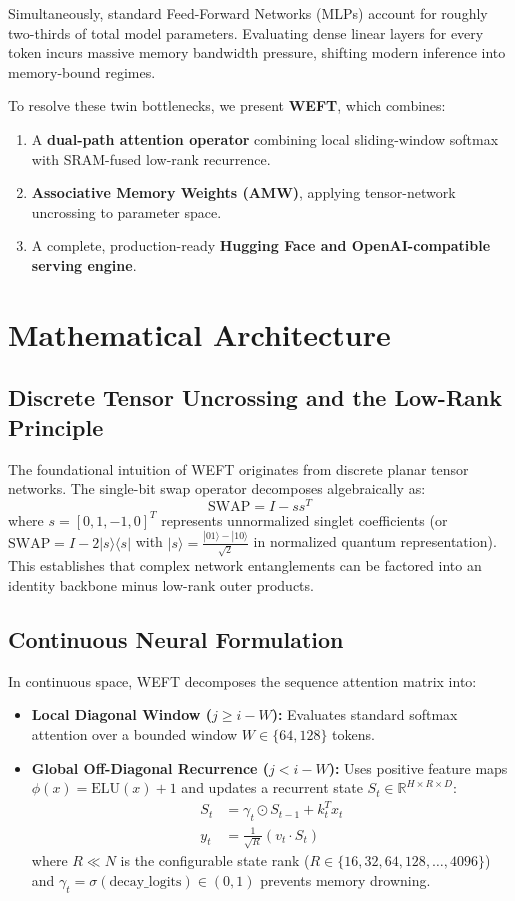\documentclass[11pt,a4paper]{article}
\begin{document}
Simultaneously, standard Feed-Forward Networks (MLPs) account for roughly two-thirds of total model parameters. Evaluating dense linear layers for every token incurs massive memory bandwidth pressure, shifting modern inference into memory-bound regimes.

To resolve these twin bottlenecks, we present \textbf{WEFT}, which combines:
\begin{enumerate}
    \item A \textbf{dual-path attention operator} combining local sliding-window softmax with SRAM-fused low-rank recurrence.
    \item \textbf{Associative Memory Weights (AMW)}, applying tensor-network uncrossing to parameter space.
    \item A complete, production-ready \textbf{Hugging Face and OpenAI-compatible serving engine}.
\end{enumerate}

\section{Mathematical Architecture}

\subsection{Discrete Tensor Uncrossing and the Low-Rank Principle}
The foundational intuition of WEFT originates from discrete planar tensor networks. The single-bit swap operator decomposes algebraically as:
\begin{equation}
\text{SWAP} = I - s s^T
\end{equation}
where $s = [0, 1, -1, 0]^T$ represents unnormalized singlet coefficients (or $\text{SWAP} = I - 2|s\rangle\langle s|$ with $|s\rangle = \frac{|01\rangle - |10\rangle}{\sqrt{2}}$ in normalized quantum representation). This establishes that complex network entanglements can be factored into an identity backbone minus low-rank outer products.

\subsection{Continuous Neural Formulation}
In continuous space, WEFT decomposes the sequence attention matrix into:
\begin{itemize}
    \item \textbf{Local Diagonal Window ($j \ge i - W$):} Evaluates standard softmax attention over a bounded window $W \in \{64, 128\}$ tokens.
    \item \textbf{Global Off-Diagonal Recurrence ($j < i - W$):} Uses positive feature maps $\phi(x) = \text{ELU}(x) + 1$ and updates a recurrent state $S_t \in \mathbb{R}^{H \times R \times D}$:
    \begin{align}
    S_t &= \gamma_t \odot S_{t-1} + k_t^T x_t \\
    y_t &= \frac{1}{\sqrt{R}} \left(v_t \cdot S_t\right)
    \end{align}
    where $R \ll N$ is the configurable state rank ($R \in \{16, 32, 64, 128, \dots, 4096\}$) and $\gamma_t = \sigma(\text{decay\_logits}) \in (0, 1)$ prevents memory drowning.
\end{itemize}
\end{document}
